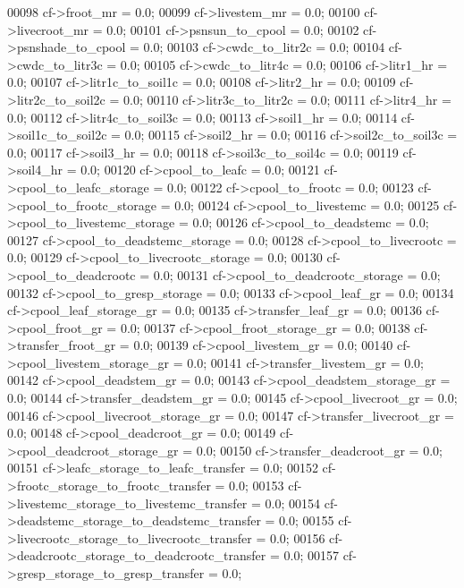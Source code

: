 \begin{DoxyCode}
00098     cf->froot\_mr = 0.0;
00099     cf->livestem\_mr = 0.0;
00100     cf->livecroot\_mr = 0.0;
00101     cf->psnsun\_to\_cpool = 0.0;
00102     cf->psnshade\_to\_cpool = 0.0;
00103     cf->cwdc\_to\_litr2c = 0.0;
00104     cf->cwdc\_to\_litr3c = 0.0;
00105     cf->cwdc\_to\_litr4c = 0.0;
00106     cf->litr1\_hr = 0.0;
00107     cf->litr1c\_to\_soil1c = 0.0;
00108     cf->litr2\_hr = 0.0;
00109     cf->litr2c\_to\_soil2c = 0.0;
00110     cf->litr3c\_to\_litr2c = 0.0;
00111     cf->litr4\_hr = 0.0;
00112     cf->litr4c\_to\_soil3c = 0.0;
00113     cf->soil1\_hr = 0.0;
00114     cf->soil1c\_to\_soil2c = 0.0;
00115     cf->soil2\_hr = 0.0;
00116     cf->soil2c\_to\_soil3c = 0.0;
00117     cf->soil3\_hr = 0.0;
00118     cf->soil3c\_to\_soil4c = 0.0;
00119     cf->soil4\_hr = 0.0;
00120     cf->cpool\_to\_leafc = 0.0;
00121     cf->cpool\_to\_leafc\_storage = 0.0;
00122     cf->cpool\_to\_frootc = 0.0;
00123     cf->cpool\_to\_frootc\_storage = 0.0;
00124     cf->cpool\_to\_livestemc = 0.0;
00125     cf->cpool\_to\_livestemc\_storage = 0.0;
00126     cf->cpool\_to\_deadstemc = 0.0;
00127     cf->cpool\_to\_deadstemc\_storage = 0.0;
00128     cf->cpool\_to\_livecrootc = 0.0;
00129     cf->cpool\_to\_livecrootc\_storage = 0.0;
00130     cf->cpool\_to\_deadcrootc = 0.0;
00131     cf->cpool\_to\_deadcrootc\_storage = 0.0;
00132     cf->cpool\_to\_gresp\_storage = 0.0;
00133     cf->cpool\_leaf\_gr = 0.0;
00134     cf->cpool\_leaf\_storage\_gr = 0.0;
00135     cf->transfer\_leaf\_gr = 0.0;
00136     cf->cpool\_froot\_gr = 0.0;
00137     cf->cpool\_froot\_storage\_gr = 0.0;
00138     cf->transfer\_froot\_gr = 0.0;
00139     cf->cpool\_livestem\_gr = 0.0;
00140     cf->cpool\_livestem\_storage\_gr = 0.0;
00141     cf->transfer\_livestem\_gr = 0.0;
00142     cf->cpool\_deadstem\_gr = 0.0;
00143     cf->cpool\_deadstem\_storage\_gr = 0.0;
00144     cf->transfer\_deadstem\_gr = 0.0;
00145     cf->cpool\_livecroot\_gr = 0.0;
00146     cf->cpool\_livecroot\_storage\_gr = 0.0;
00147     cf->transfer\_livecroot\_gr = 0.0;
00148     cf->cpool\_deadcroot\_gr = 0.0;
00149     cf->cpool\_deadcroot\_storage\_gr = 0.0;
00150     cf->transfer\_deadcroot\_gr = 0.0;
00151     cf->leafc\_storage\_to\_leafc\_transfer = 0.0;
00152     cf->frootc\_storage\_to\_frootc\_transfer = 0.0;
00153     cf->livestemc\_storage\_to\_livestemc\_transfer = 0.0;
00154     cf->deadstemc\_storage\_to\_deadstemc\_transfer = 0.0;
00155     cf->livecrootc\_storage\_to\_livecrootc\_transfer = 0.0;
00156     cf->deadcrootc\_storage\_to\_deadcrootc\_transfer = 0.0;
00157     cf->gresp\_storage\_to\_gresp\_transfer = 0.0;

\end{DoxyCode}

